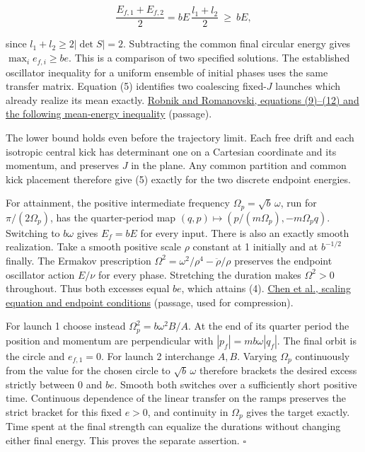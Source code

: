 \documentclass[11pt,a4paper]{article}
\begin{document}
\[
 \frac{E_{f,1}+E_{f,2}}2=bE\,\frac{l_1+l_2}{2}\ \ge\ bE,             \tag{5}
\]

since \(l_1+l_2\ge2|\det S|=2\). Subtracting the common final circular
energy gives \(\max_i e_{f,i}\ge be\). This is a comparison of two
specified solutions. The established oscillator inequality for a uniform
ensemble of initial phases uses the same transfer matrix. Equation (5)
identifies two coalescing fixed-\(J\) launches which already realize its
mean exactly. \href{https://arxiv.org/pdf/nlin/0506033}{Robnik and
Romanovski, equations (9)--(12) and the following mean-energy
inequality} (passage).

The lower bound holds even before the trajectory limit. Each free drift
and each isotropic central kick has determinant one on a Cartesian
coordinate and its momentum, and preserves \(J\) in the plane. Any
common partition and common kick placement therefore give (5) exactly
for the two discrete endpoint energies.

For attainment, the positive intermediate frequency
\(\Omega_p=\sqrt b\,\omega\), run for \(\pi/(2\Omega_p)\), has the
quarter-period map \((q,p)\mapsto(p/(m\Omega_p),-m\Omega_p q)\).
Switching to \(b\omega\) gives \(E_f=bE\) for every input. There is also
an exactly smooth realization. Take a smooth positive scale \(\rho\)
constant at 1 initially and at \(b^{-1/2}\) finally. The Ermakov
prescription \(\Omega^2=\omega^2/\rho^4-\ddot\rho/\rho\) preserves the
endpoint oscillator action \(E/\nu\) for every phase. Stretching the
duration makes \(\Omega^2>0\) throughout. Thus both excesses equal
\(be\), which attains (4). \href{https://arxiv.org/pdf/0910.0709}{Chen
et al., scaling equation and endpoint conditions} (passage, used for
compression).

For launch 1 choose instead \(\Omega_p^2=b\omega^2 B/A\). At the end of
its quarter period the position and momentum are perpendicular with
\(|p_f|=mb\omega|q_f|\). The final orbit is the circle and
\(e_{f,1}=0\). For launch 2 interchange \(A,B\). Varying \(\Omega_p\)
continuously from the value for the chosen circle to \(\sqrt b\,\omega\)
therefore brackets the desired excess strictly between 0 and \(be\).
Smooth both switches over a sufficiently short positive time. Continuous
dependence of the linear transfer on the ramps preserves the strict
bracket for this fixed \(e>0\), and continuity in \(\Omega_p\) gives the
target exactly. Time spent at the final strength can equalize the
durations without changing either final energy. This proves the separate
assertion. \(\square\)
\end{document}
